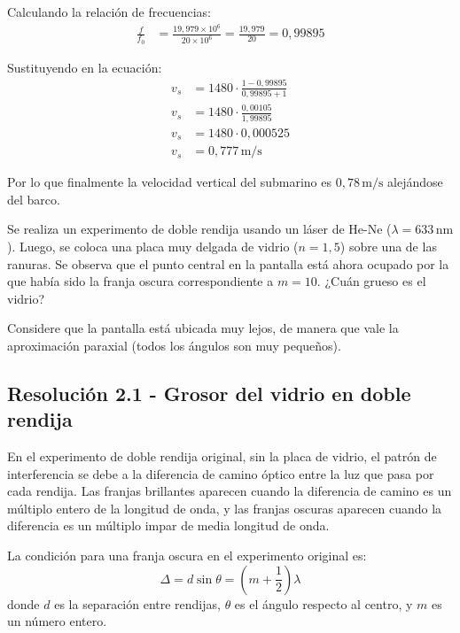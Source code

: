 \documentclass[
  11pt,
  letterpaper,
   addpoints,
   answers
  ]{exam}
\begin{document}
\begin{questions}
\begin{solution}
Calculando la relación de frecuencias:
\begin{align}
\frac{f}{f_0} &= \frac{19{,}979 \times 10^6}{20 \times 10^6} = \frac{19{,}979}{20} = 0{,}99895
\end{align}

Sustituyendo en la ecuación:
\begin{align}
v_s &= 1480 \cdot \frac{1 - 0{,}99895}{0{,}99895 + 1} \\
v_s &= 1480 \cdot \frac{0{,}00105}{1{,}99895} \\
v_s &= 1480 \cdot 0{,}000525 \\
v_s &= 0{,}777\,\mathrm{m/s}
\end{align}

Por lo que finalmente la velocidad vertical del submarino es $\boxed{0{,}78\,\mathrm{m/s}}$ alejándose del barco.

\end{solution}
\question Se realiza un experimento de doble rendija usando un láser de He-Ne ($\lambda = 633\,\mathrm{nm}$). Luego, se coloca una placa muy delgada de vidrio ($n = 1{,}5$) sobre una de las ranuras. Se observa que el punto central en la pantalla está ahora ocupado por la que había sido la franja oscura correspondiente a $m = 10$. ¿Cuán grueso es el vidrio?

Considere que la pantalla está ubicada muy lejos, de manera que vale la aproximación paraxial (todos los ángulos son muy pequeños).
\begin{solution}
\subsection*{Resolución 2.1 - Grosor del vidrio en doble rendija}

En el experimento de doble rendija original, sin la placa de vidrio, el patrón de interferencia se debe a la diferencia de camino óptico entre la luz que pasa por cada rendija. Las franjas brillantes aparecen cuando la diferencia de camino es un múltiplo entero de la longitud de onda, y las franjas oscuras aparecen cuando la diferencia es un múltiplo impar de media longitud de onda.

La condición para una franja oscura en el experimento original es:
\begin{equation}
\Delta = d \sin \theta = \left(m + \frac{1}{2}\right) \lambda
\end{equation}
donde $d$ es la separación entre rendijas, $\theta$ es el ángulo respecto al centro, y $m$ es un número entero.


\end{solution}
\end{questions}
\end{document}
